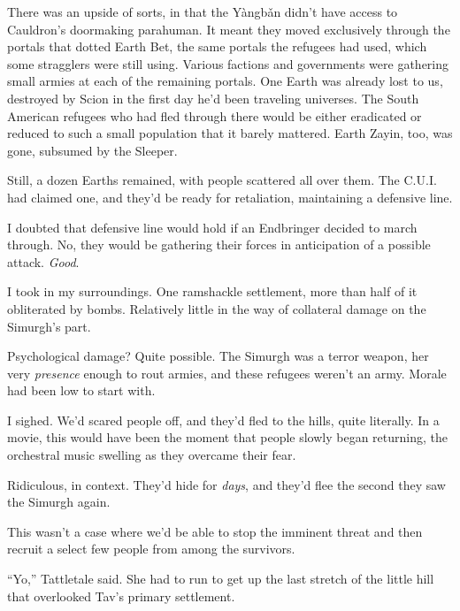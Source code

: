 There was an upside of sorts, in that the Y\`{a}ngb\v{a}n didn't have access to Cauldron's doormaking parahuman.  It meant they moved exclusively through the portals that dotted Earth Bet, the same portals the refugees had used, which some stragglers were still using.  Various factions and governments were gathering small armies at each of the remaining portals.  One Earth was already lost to us, destroyed by Scion in the first day he'd been traveling universes.  The South American refugees who had fled through there would be either eradicated or reduced to such a small population that it barely mattered.  Earth Zayin, too, was gone, subsumed by the Sleeper.



Still, a dozen Earths remained, with people scattered all over them.  The C.U.I. had claimed one, and they'd be ready for retaliation, maintaining a defensive line.



I doubted that defensive line would hold if an Endbringer decided to march through.  No, they would be gathering their forces in anticipation of a possible attack.  \emph{Good}.



I took in my surroundings.  One ramshackle settlement, more than half of it obliterated by bombs.  Relatively little in the way of collateral damage on the Simurgh's part.



Psychological damage?  Quite possible.  The Simurgh was a terror weapon, her very \emph{presence} enough to rout armies, and these refugees weren't an army.  Morale had been low to start with.



I sighed.  We'd scared people off, and they'd fled to the hills, quite literally.  In a movie, this would have been the moment that people slowly began returning, the orchestral music swelling as they overcame their fear.



Ridiculous, in context.  They'd hide for \emph{days}, and they'd flee the second they saw the Simurgh again.



This wasn't a case where we'd be able to stop the imminent threat and then recruit a select few people from among the survivors.



``Yo,'' Tattletale said.  She had to run to get up the last stretch of the little hill that overlooked Tav's primary settlement.



